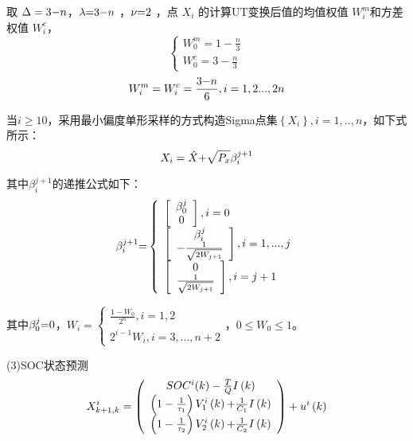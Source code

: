 取 $\Delta  = 3{\rm{ - }}n$，$\lambda {\rm{ = }}3{\rm{ - }}n$ ，$\nu {\rm{ = }}2$ ，点 ${X_i}$ 的计算UT变换后值的均值权值 $W_i^m$和方差权值 $W_i^c$，	
\begin{equation}
\left\{ \begin{array}{l}
W_0^m = 1 - \frac{n}{3}\\
W_0^c = 3 - \frac{n}{3}
\end{array} \right.
\end{equation}
\begin{equation}
W_i^m = W_i^c = \frac{{3{\rm{ - }}n}}{6},i = 1,2...,2n
\end{equation}

当$i \ge 10$，采用最小偏度单形采样的方式构造Sigma点集$\left\{ {{X_i}} \right\},i = 1,..,n$，如下式所示：
\begin{equation}
{X_i} = \hat X{\rm{ + }}\sqrt {{P_x}} \beta _i^{j + 1}
\end{equation}

其中$\beta _i^{j + 1}$的递推公式如下：
\begin{equation}
\beta _i^{j + 1}{\rm{ = }}\left\{ \begin{array}{l}
\left[ {\begin{array}{*{20}{c}}
{\beta _0^j}\\
0
\end{array}} \right],i = 0\\
\left[ {\begin{array}{*{20}{c}}
{\beta _i^j}\\
{ - \frac{1}{{\sqrt {2{W_{j + 1}}} }}}
\end{array}} \right],i = 1,...,j\\
\left[ {\begin{array}{*{20}{c}}
0\\
{\frac{1}{{\sqrt {2{W_{j + 1}}} }}}
\end{array}} \right],i = j + 1
\end{array} \right.
\end{equation}

其中$\beta _0^j{\rm{ = }}0$，${W_i} = \left\{ \begin{array}{l}
\frac{{1 - {W_0}}}{{{2^n}}},i = 1,2\\
{2^{i - 1}}{W_i},i = 3,...,n + 2
\end{array} \right.$，$0 \le {W_0} \le 1$。

(3)SOC状态预测
\begin{equation}
X_{k + 1,k}^i = \left( {\begin{array}{*{20}{c}}
{SO{C^i}(k) - \frac{T}{Q}I\left( k \right)}\\
{\left( {1 - \frac{1}{{{\tau _1}}}} \right)V_1^i\left( k \right){\rm{ + }}\frac{1}{{{C_1}}}I\left( k \right)}\\
{\left( {1 - \frac{1}{{{\tau _2}}}} \right)V_2^i\left( k \right){\rm{ + }}\frac{1}{{{C_2}}}I\left( k \right)}
\end{array}} \right) + {u^i}\left( k \right)
\end{equation}

